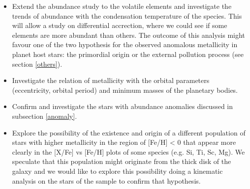 \documentclass[dvips,12pt,a4paper]{report}
\begin{document}
{{\begin{itemize}
\item Extend the abundance study to the volatile elements and investigate the trends of abundance with the condensation temperature of the species. This will allow a study on differential accrection, where we could see if some elements are more abundant than others. The outcome of this analysis might favour one of the two hypothesis for the observed anomalous metallicity in planet host stars: the primordial origin or the external pollution process (see section \ref{others}). 

\item Investigate the relation of metallicity with the orbital parameters (eccentricity, orbital period) and minimum masses of the planetary bodies.

\item Confirm and investigate the stars with abundance anomalies discussed in subsection \ref{anomaly}.

\item Explore the possibility of the existence and origin of a different population of stars with higher metallicity in the region of [Fe/H] < 0 that appear more clearly in the [X/Fe] vs [Fe/H] plots of some species (e.g. Si, Ti, Sc, Mg). We speculate that this population might originate from the thick disk of the galaxy and we would like to explore this possibility doing a kinematic analysis on the stars of the sample to confirm that hypothesis. 

\end{itemize}

 










}}
\end{document}
